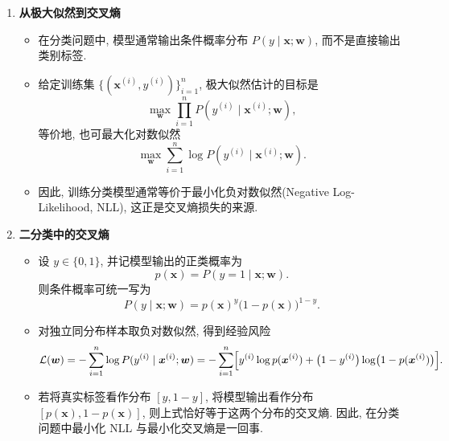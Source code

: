 \documentclass{../nndlcourse}
\begin{document}
\begin{enumerate}
    \item \textbf{从极大似然到交叉熵}
    \begin{itemize}
        \item 在分类问题中, 模型通常输出条件概率分布 $P(y \mid \boldsymbol{x}; \boldsymbol{w})$, 而不是直接输出类别标签.
        \item 给定训练集 $\{(\boldsymbol{x}^{(i)}, y^{(i)})\}_{i=1}^n$, 极大似然估计的目标是
        \begin{equation*}
            \max_{\boldsymbol{w}} \prod_{i=1}^n P(y^{(i)} \mid \boldsymbol{x}^{(i)}; \boldsymbol{w}),
        \end{equation*}
        等价地, 也可最大化对数似然
        \begin{equation*}
            \max_{\boldsymbol{w}} \sum_{i=1}^n \log P(y^{(i)} \mid \boldsymbol{x}^{(i)}; \boldsymbol{w}).
        \end{equation*}
        \item 因此, 训练分类模型通常等价于最小化负对数似然(Negative Log-Likelihood, NLL), 这正是交叉熵损失的来源.
    \end{itemize}
    \item \textbf{二分类中的交叉熵}
    \begin{itemize}
        \item 设 $y \in \{0, 1\}$, 并记模型输出的正类概率为
        \begin{equation*}
            p(\boldsymbol{x}) = P(y = 1 \mid \boldsymbol{x}; \boldsymbol{w}).
        \end{equation*}
        则条件概率可统一写为
        \begin{equation*}
            P(y \mid \boldsymbol{x}; \boldsymbol{w}) = p(\boldsymbol{x})^y \bigl(1 - p(\boldsymbol{x})\bigr)^{1-y}.
        \end{equation*}
        \item 对独立同分布样本取负对数似然, 得到经验风险
        \begin{equation*}
            \mathcal{L}(\boldsymbol{w})
            = -\sum_{i=1}^n \log P(y^{(i)} \mid \boldsymbol{x}^{(i)}; \boldsymbol{w})
            = -\sum_{i=1}^n \Bigl[
                y^{(i)} \log p(\boldsymbol{x}^{(i)})
                + \bigl(1 - y^{(i)}\bigr)\log\bigl(1 - p(\boldsymbol{x}^{(i)})\bigr)
            \Bigr].
        \end{equation*}
        \item 若将真实标签看作分布 $[y, 1-y]$, 将模型输出看作分布 $[p(\boldsymbol{x}), 1-p(\boldsymbol{x})]$, 则上式恰好等于这两个分布的交叉熵. 因此, 在分类问题中最小化 NLL 与最小化交叉熵是一回事.

\end{itemize}
\end{enumerate}
\end{document}
